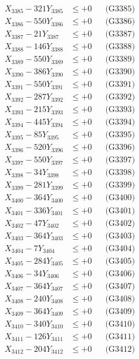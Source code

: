 \documentclass[a4paper,10pt]{article}
\begin{document}
{\begin{align}
X_{3385} - 321Y_{3385} &\leq +0 && \text{(G3385)} \\
X_{3386} - 550Y_{3386} &\leq +0 && \text{(G3386)} \\
X_{3387} - 21Y_{3387} &\leq +0 && \text{(G3387)} \\
X_{3388} - 146Y_{3388} &\leq +0 && \text{(G3388)} \\
X_{3389} - 550Y_{3389} &\leq +0 && \text{(G3389)} \\
X_{3390} - 386Y_{3390} &\leq +0 && \text{(G3390)} \\
\allowbreak
X_{3391} - 550Y_{3391} &\leq +0 && \text{(G3391)} \\
X_{3392} - 287Y_{3392} &\leq +0 && \text{(G3392)} \\
X_{3393} - 215Y_{3393} &\leq +0 && \text{(G3393)} \\
X_{3394} - 445Y_{3394} &\leq +0 && \text{(G3394)} \\
X_{3395} - 85Y_{3395} &\leq +0 && \text{(G3395)} \\
X_{3396} - 520Y_{3396} &\leq +0 && \text{(G3396)} \\
X_{3397} - 550Y_{3397} &\leq +0 && \text{(G3397)} \\
X_{3398} - 34Y_{3398} &\leq +0 && \text{(G3398)} \\
X_{3399} - 281Y_{3399} &\leq +0 && \text{(G3399)} \\
X_{3400} - 364Y_{3400} &\leq +0 && \text{(G3400)} \\
\allowbreak
X_{3401} - 336Y_{3401} &\leq +0 && \text{(G3401)} \\
X_{3402} - 47Y_{3402} &\leq +0 && \text{(G3402)} \\
X_{3403} - 364Y_{3403} &\leq +0 && \text{(G3403)} \\
X_{3404} - 7Y_{3404} &\leq +0 && \text{(G3404)} \\
X_{3405} - 284Y_{3405} &\leq +0 && \text{(G3405)} \\
X_{3406} - 34Y_{3406} &\leq +0 && \text{(G3406)} \\
X_{3407} - 364Y_{3407} &\leq +0 && \text{(G3407)} \\
X_{3408} - 240Y_{3408} &\leq +0 && \text{(G3408)} \\
X_{3409} - 364Y_{3409} &\leq +0 && \text{(G3409)} \\
X_{3410} - 340Y_{3410} &\leq +0 && \text{(G3410)} \\
\allowbreak
X_{3411} - 126Y_{3411} &\leq +0 && \text{(G3411)} \\
X_{3412} - 204Y_{3412} &\leq +0 && \text{(G3412)} \\

\end{align}}
\end{document}
